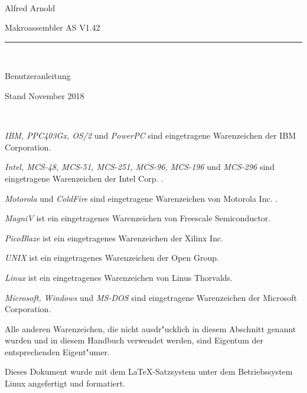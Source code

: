\documentclass[12pt,a4paper,twoside]{report}
\begin{document}
\thispagestyle{empty}

\
\vspace{7cm}\par

\begin{raggedright}
{\large Alfred Arnold}\\
\vspace{1cm}\par
{\huge Makroassembler AS V1.42}\\
\rule{9.5cm}{0.3mm}\\
\vspace{2mm}\par
{\huge Benutzeranleitung}

\vspace{1cm}\par

{\large Stand November 2018}
\end{raggedright}

\clearpage
\thispagestyle{empty}

\ \vspace{4cm}

{\em IBM, PPC403Gx, OS/2} und {\em PowerPC} sind eingetragene Warenzeichen
der IBM Corporation.

{\em Intel, MCS-48, MCS-51, MCS-251, MCS-96, MCS-196} und {\em MCS-296}
sind eingetragene Warenzeichen der Intel Corp. .

{\em Motorola} und {\em ColdFire} sind eingetragene Warenzeichen von
Motorola Inc. .

{\em MagniV} ist ein eingetragenes Warenzeichen von Freescale Semiconductor.

{\em PicoBlaze} ist ein eingetragenes Warenzeichen der Xilinx Inc.

{\em UNIX} ist ein eingetragenes Warenzeichen der Open Group.

{\em Linux} ist ein eingetragenes Warenzeichen von Linus Thorvalds.

{\em Microsoft, Windows} und {\em MS-DOS} sind eingetragene Warenzeichen
der Microsoft Corporation.

Alle anderen Warenzeichen, die nicht ausdr"ucklich in diesem Abschnitt
genannt wurden und in diesem Handbuch verwendet werden, sind Eigentum
der entsprechenden Eigent"umer.

\vspace{6cm}

Dieses Dokument wurde mit dem LaTeX-Satzsystem unter dem Betriebssystem
Linux angefertigt und formatiert.
\end{document}
